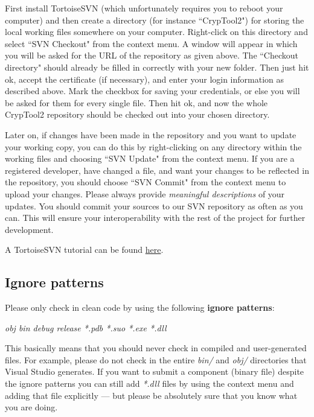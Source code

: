 First install TortoiseSVN (which unfortunately requires you to reboot your computer) and then create a directory (for instance ``CrypTool2") for storing the local working files somewhere on your computer. Right-click on this directory and select ``SVN Checkout" from the context menu. A window will appear in which you will be asked for the URL of the repository as given above. The ``Checkout directory" should already be filled in correctly with your new folder. Then just hit ok, accept the certificate (if necessary), and enter your login information as described above. Mark the checkbox for saving your credentials, or else you will be asked for them for every single file. Then hit ok, and now the whole CrypTool2 repository should be checked out into your chosen directory.

Later on, if changes have been made in the repository and you want to update your working copy, you can do this by right-clicking on any directory within the working files and choosing ``SVN Update" from the context menu. If you are a registered developer, have changed a file, and want your changes to be reflected in the repository, you should choose ``SVN Commit" from the context menu to upload your changes. Please always provide \textit{meaningful descriptions} of your updates. You should commit your sources to our SVN repository as often as you can. This will ensure your interoperability with the rest of the project for further development.

A TortoiseSVN tutorial can be found \href{http://www.mind.ilstu.edu/research/robots/iris4/developers/svntutorial}{here}.

\subsection*{Ignore patterns}
\label{IgnorePatterns}

Please only check in clean code by using the following \textbf{ignore patterns}:

\begin{center}
\textit{obj bin debug release *.pdb *.suo *.exe *.dll}
\end{center}

This basically means that you should never check in compiled and user-generated files. For example, please do not check in the entire \textit{bin/} and \textit{obj/} directories that Visual Studio generates. If you want to submit a component (binary file) despite the ignore patterns you can still add \textit{*.dll} files by using the context menu and adding that file explicitly --- but please be absolutely sure that you know what you are doing.

